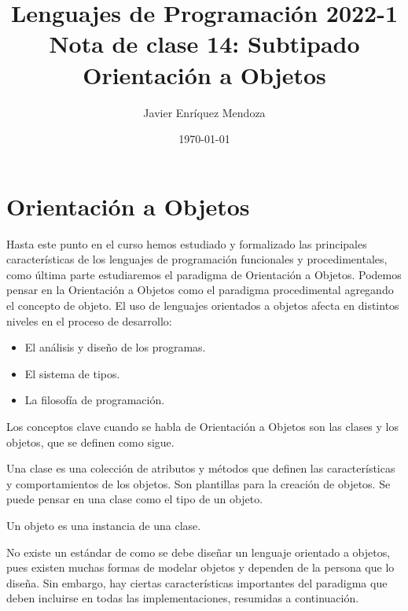 \documentclass[12pt]{extarticle}
\title{\LARGE 
Lenguajes de Programación 2022-1\\ 
Nota de clase 14: Subtipado\\
\color{ForestGreen} Orientación a Objetos}
\author{Javier Enríquez Mendoza}
\date{\today}
\begin{document}
\maketitle

\section{Orientación a Objetos}

Hasta este punto en el curso hemos estudiado y formalizado las principales características de los lenguajes de programación funcionales y procedimentales, como última parte estudiaremos el paradigma de Orientación a Objetos. Podemos pensar en la Orientación a Objetos como el paradigma procedimental agregando el concepto de objeto. El uso de lenguajes orientados a objetos afecta en distintos niveles en el proceso de desarrollo:
\begin{itemize}
	\item El análisis y diseño de los programas.
	\item El sistema de tipos.
	\item La filosofía de programación.
\end{itemize}

Los conceptos clave cuando se habla de Orientación a Objetos son las clases y los objetos, que se definen como sigue.

\begin{definition}[Clase] Una clase es una colección de atributos y métodos que definen las características y comportamientos de los objetos. Son plantillas para la creación de objetos. Se puede pensar en una clase como el tipo de un objeto.
\end{definition}

\begin{definition}[Objeto] Un objeto es una instancia de una clase.
\end{definition}

No existe un estándar de como se debe diseñar un lenguaje orientado a objetos, pues existen muchas formas de modelar objetos y dependen de la persona que lo diseña. Sin embargo, hay ciertas características importantes del paradigma que deben incluirse en todas las implementaciones, resumidas a continuación.
\end{document}
